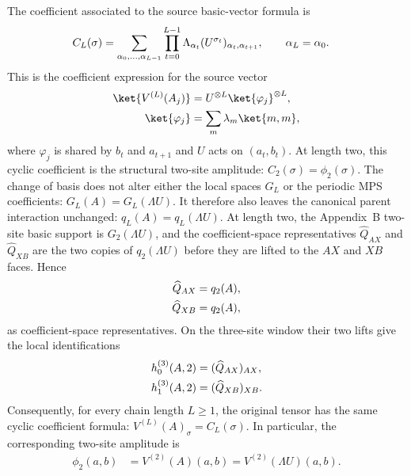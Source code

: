 \begin{remark}
    The coefficient associated to the source basic-vector formula is
    \begin{align}
        C_L(\sigma)
         & =
        \sum_{\alpha_0,\ldots,\alpha_{L-1}}
        \prod_{t=0}^{L-1}
        \Lambda_{\alpha_t}
        (U^{\sigma_t})_{\alpha_t,\alpha_{t+1}},
        \qquad \alpha_L=\alpha_0.
        \notag
    \end{align}
    This is the coefficient expression for the source vector
    \begin{align}
        \ket{V^{(L)}(A_j)}
         & =
        U^{\otimes L}\ket{\varphi_j}^{\otimes L},
        \notag \\
        \ket{\varphi_j}
         & =
        \sum_m\lambda_m\ket{m,m},
        \notag
    \end{align}
    where $\varphi_j$ is shared by $b_t$ and $a_{t+1}$ and $U$ acts on
    $(a_t,b_t)$.
    At length two, this cyclic coefficient is the structural two-site amplitude:
    $C_2(\sigma)=\phi_2(\sigma)$.
    The change of basis does not alter either the local spaces $G_L$ or the
    periodic MPS coefficients: $G_L(A)=G_L(\Lambda U)$.
    It therefore also leaves the canonical parent interaction unchanged:
    $q_L(A)=q_L(\Lambda U)$.
    At length two, the Appendix~B two-site basic support is
    $G_2(\Lambda U)$, and the coefficient-space representatives
    $\widehat Q_{AX}$ and $\widehat Q_{XB}$ are the two copies of
    $q_2(\Lambda U)$ before they are lifted to the $AX$ and $XB$ faces.
    Hence
    \begin{align}
        \widehat Q_{AX}
         & =
        q_2(A),
        \notag \\
        \widehat Q_{XB}
         & =
        q_2(A),
        \notag
    \end{align}
    as coefficient-space representatives. On the three-site window their two
    lifts give the local identifications
    \begin{align}
        h_0^{(3)}(A,2)
         & =
        (\widehat Q_{AX})_{AX},
        \notag \\
        h_1^{(3)}(A,2)
         & =
        (\widehat Q_{XB})_{XB}.
        \notag
    \end{align}
    Consequently, for every chain length $L\geq1$, the original tensor has
    the same cyclic coefficient formula:
    $V^{(L)}(A)_\sigma=C_L(\sigma)$.
    In particular, the corresponding two-site amplitude is
    \begin{align}
        \phi_2(a,b)
         & =
        V^{(2)}(A)(a,b) =
        V^{(2)}(\Lambda U)(a,b).

\end{align}
\end{remark}
